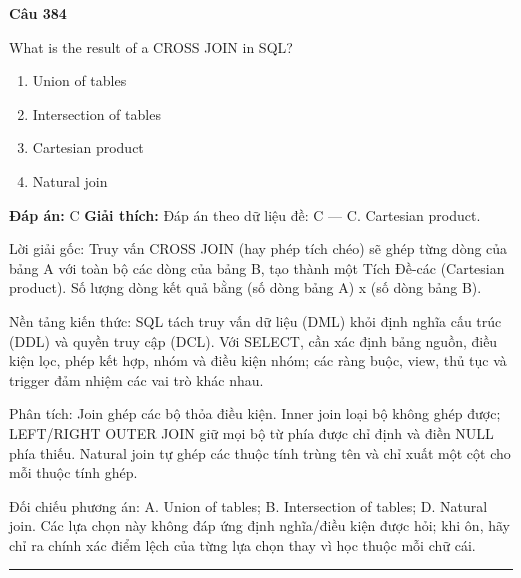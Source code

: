 \documentclass[11pt,a4paper]{article}
\newenvironment{question}[1]{%
  \par\vspace{1em}\noindent\textbf{\large Câu #1}\par\vspace{0.4em}
}{%
  \par\vspace{1em}\hrule\vspace{0.6em}
}
\newenvironment{choices}{%
  \begin{enumerate}[label=\textbf{\Alph*.},leftmargin=2.2em,itemsep=2pt,topsep=3pt]
}{%
  \end{enumerate}
}
\newcommand{\choice}{\item}
\begin{document}
\begin{question}{384}
What is the result of a CROSS JOIN in SQL?
\begin{choices}
\choice Union of tables
\choice Intersection of tables
\choice Cartesian product
\choice Natural join
\end{choices}
\textbf{Đáp án:} C
\textbf{Giải thích:} Đáp án theo dữ liệu đề: C — C. Cartesian product.

Lời giải gốc: Truy vấn CROSS JOIN (hay phép tích chéo) sẽ ghép từng dòng của bảng A với toàn bộ các dòng của bảng B, tạo thành một Tích Đề-các (Cartesian product). Số lượng dòng kết quả bằng (số dòng bảng A) x (số dòng bảng B).

Nền tảng kiến thức: SQL tách truy vấn dữ liệu (DML) khỏi định nghĩa cấu trúc (DDL) và quyền truy cập (DCL). Với SELECT, cần xác định bảng nguồn, điều kiện lọc, phép kết hợp, nhóm và điều kiện nhóm; các ràng buộc, view, thủ tục và trigger đảm nhiệm các vai trò khác nhau.

Phân tích: Join ghép các bộ thỏa điều kiện. Inner join loại bộ không ghép được; LEFT/RIGHT OUTER JOIN giữ mọi bộ từ phía được chỉ định và điền NULL phía thiếu. Natural join tự ghép các thuộc tính trùng tên và chỉ xuất một cột cho mỗi thuộc tính ghép.

Đối chiếu phương án: A. Union of tables; B. Intersection of tables; D. Natural join. Các lựa chọn này không đáp ứng định nghĩa/điều kiện được hỏi; khi ôn, hãy chỉ ra chính xác điểm lệch của từng lựa chọn thay vì học thuộc mỗi chữ cái.
\end{question}
\end{document}
